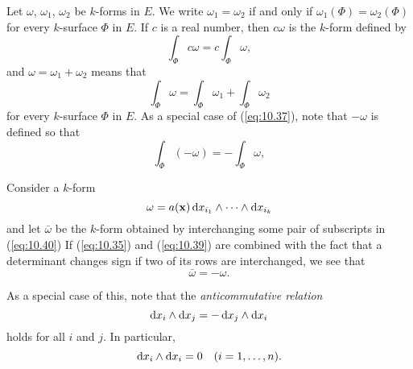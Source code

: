 \begin{myRemark}
    Let $\omega$, $\omega_1$, $\omega_2$ be $k$-forms in $E$.
    We write $\omega_1 = \omega_2$ 
    if and only if $\omega_1(\Phi) = \omega_2(\Phi)$
    for every $k$-surface $\Phi$ in $E$.
    If $c$ is a real number, 
    then $c\omega$ is the $k$-form defined by 
    \begin{equation}
        \label{eq:10.37}
        \int_{\Phi} c\omega = 
        c\int_{\Phi} \omega ,
    \end{equation}
    and $\omega = \omega_1 + \omega_2$ means that 
    \begin{equation}
        \label{eq:10.38}
        \int_{\Phi} \omega = 
        \int_{\Phi} \omega_1 + 
        \int_{\Phi} \omega_2  
    \end{equation}
    for every $k$-surface $\Phi$ in $E$.
    As a special case of (\ref{eq:10.37}), 
    note that $-\omega$ is defined so that 
    \begin{equation}
        \label{eq:10.39}
        \int_{\Phi} (-\omega) = 
        -\int_{\Phi} \omega ,
    \end{equation}

    Consider a $k$-form 
    \begin{equation}
        \label{eq:10.40}
        \omega = a(\mathbf{x}) 
        \d x_{i_1} 
        \wedge \cdots \wedge 
        \d x_{i_k} 
    \end{equation}
    and let $\bar{\omega}$ be the $k$-form obtained by interchanging some pair of subscripts in (\ref{eq:10.40})
    If (\ref{eq:10.35}) and (\ref{eq:10.39}) are combined with the fact that a determinant changes sign if two of its rows are interchanged,
    we see that 
    \begin{equation}
        \label{eq:10.41}
        \bar{\omega} = -\omega.
    \end{equation}

    As a special case of this, note that the \emph{anticommutative relation}
    \begin{equation}
        \label{eq:10.42}
        \d x_i \wedge \d x_j = 
        -\d x_j \wedge \d x_i 
    \end{equation}
    holds for all $i$ and $j$.
    In particular,
    \begin{equation}
        \label{eq:10.43}
        \d x_i \wedge \d x_i = 0
        \quad (i = 1, \dots, n).
    \end{equation}


\end{myRemark}
